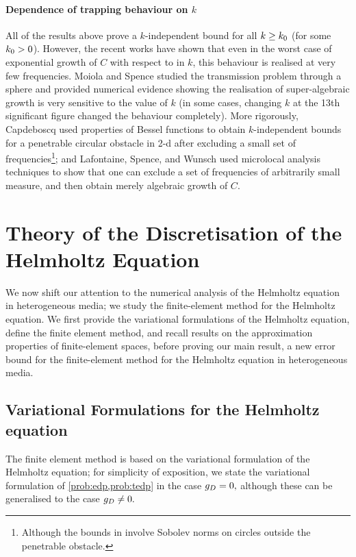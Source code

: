 \paragraph{Dependence of trapping behaviour on $k$} All of the results above prove a $k$-independent bound for all $k \geq k_{0}$ (for some $k_{0} > 0$). However, the recent works \cite{Ca:12,MoSp:19,LaSpWu:19} have shown that even in the worst case of exponential growth of $C$ with respect to in $k$, this behaviour is realised at very few frequencies. Moiola and Spence \cite{MoSp:19} studied the transmission problem through a sphere and provided numerical evidence showing the realisation of super-algebraic growth is very sensitive to the value of $k$ (in some cases, changing $k$ at the 13th significant figure changed the behaviour completely). More rigorously, Capdeboscq \cite{Ca:12} used properties of Bessel functions to obtain $k$-independent bounds for a penetrable circular obstacle in 2-d after excluding a small set of frequencies\footnote{Although the bounds in \cite{Cap:12} involve Sobolev norms on circles outside the penetrable obstacle.}; and Lafontaine, Spence, and Wunsch \cite{LaSpWu:19} used microlocal analysis techniques to show that one can exclude a set of frequencies of arbitrarily small measure, and then obtain merely algebraic growth of $C$.



\section{Theory of the Discretisation of the Helmholtz Equation}\label{sec:helmfe}

We now shift our attention to the numerical analysis of the Helmholtz equation in heterogeneous media; we  study the finite-element method for the Helmholtz equation. We first provide the variational formulations of the Helmholtz equation, define the finite element method, and recall results on the approximation properties of finite-element spaces, before proving our main result, a new error bound for the finite-element method for the Helmholtz equation in heterogeneous media.

  \subsection{Variational Formulations for the Helmholtz equation}\label{sec:varform}
  The finite element method is based on the variational formulation of the Helmholtz equation; for simplicity of exposition, we state the variational formulation of \cref{prob:edp,prob:tedp} in the case $g_{D} = 0,$ although these can be generalised to the case $g_{D} \neq 0.$
  
